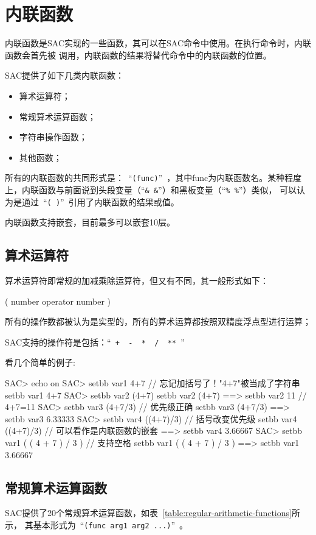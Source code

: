 \section{内联函数}

内联函数是SAC实现的一些函数，其可以在SAC命令中使用。在执行命令时，内联函数会首先被
调用，内联函数的结果将替代命令中的内联函数的位置。

SAC提供了如下几类内联函数：
\begin{itemize}
\item 算术运算符；
\item 常规算术运算函数；
\item 字符串操作函数；
\item 其他函数；
\end{itemize}

所有的内联函数的共同形式是：~``\lstinline{(func)}''~，其中func为内联函数名。某种程度
上，内联函数与前面说到头段变量（``\lstinline{& &}''）和黑板变量（``\lstinline{% %}''）类似，
可以认为是通过~``\lstinline{( )}''~引用了内联函数的结果或值。

内联函数支持嵌套，目前最多可以嵌套10层。

\subsection{算术运算符}
算术运算符即常规的加减乘除运算符，但又有不同，其一般形式如下：
\begin{SACCode}
    ( number operator number ) 
\end{SACCode}
所有的操作数都被认为是实型的，所有的算术运算都按照双精度浮点型进行运算；

SAC支持的操作符是包括：``\lstinline{ +  -  *  /  ** }''

看几个简单的例子:
\begin{SACCode}
SAC> echo on                
SAC> setbb var1 4+7             // 忘记加括号了！"4+7"被当成了字符串
 setbb var1 4+7
SAC> setbb var2 (4+7)           
 setbb var2 (4+7)
 ==>  setbb var2 11             // 4+7=11
SAC> setbb var3 (4+7/3)         // 优先级正确
 setbb var3 (4+7/3)
 ==>  setbb var3 6.33333
SAC> setbb var4 ((4+7)/3)       // 括号改变优先级
 setbb var4 ((4+7)/3)           // 可以看作是内联函数的嵌套
 ==>  setbb var4 3.66667
SAC> setbb var1 ( ( 4 + 7 ) / 3 )   // 支持空格
 setbb var1 ( ( 4 + 7 ) / 3 )
 ==>  setbb var1 3.66667
\end{SACCode}

\subsection{常规算术运算函数}
SAC提供了20个常规算术运算函数，如表~\ref{table:regular-arithmetic-functions}所示，
其基本形式为~``\lstinline{(func arg1 arg2 ...)}''~。

